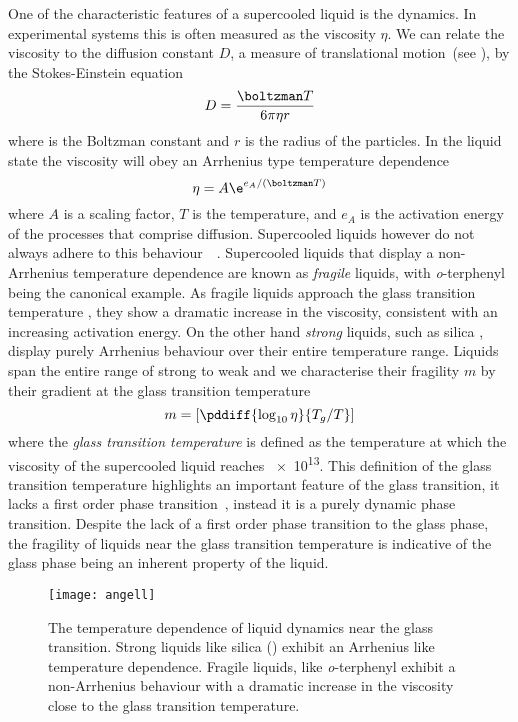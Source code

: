 One of the characteristic features of a supercooled liquid is the dynamics. In experimental systems this is often measured as the viscosity $\eta$. We can relate the viscosity to the diffusion constant $D$, a measure of translational motion~(see ), by the Stokes-Einstein equation~\cite{lubchenko:07}
\begin{equation}
    D = \frac{\boltzman T}{6\pi \eta r}
\end{equation}
where \boltzman{} is the Boltzman constant and $r$ is the radius of the particles. In the liquid state the viscosity will obey an Arrhenius type temperature dependence
\begin{equation}
    \eta = A \e^{e_A/(\boltzman T)}
\end{equation}
where $A$ is a scaling factor, $T$ is the temperature, and $e_A$ is the activation energy of the processes that comprise diffusion. Supercooled liquids however do not always adhere to this behaviour~~\cite{angell:91,angell:95,lubchenko:07}. Supercooled liquids that display a non-Arrhenius temperature dependence are known as \emph{fragile} liquids, with \emph{o}-terphenyl being the canonical example. As fragile liquids approach the glass transition temperature \si{\Tg}, they show a dramatic increase in the viscosity, consistent with an increasing activation energy. On the other hand \emph{strong} liquids, such as silica , display purely Arrhenius behaviour over their entire temperature range. Liquids span the entire range of strong to weak and we characterise their fragility $m$ by their gradient at the glass transition temperature
\begin{equation}
    m = \left [ \pddiff{\log_{10}\eta}{T_g/T} \right ]
\end{equation}
where the \emph{glass transition temperature} \si{\Tg} is defined as the temperature at which the viscosity of the supercooled liquid reaches \SI{e13}{\poise}. This definition of the glass transition temperature highlights an important feature of the glass transition, it lacks a first order phase transition~\cite{santen:00}, instead it is a purely dynamic phase transition. Despite the lack of a first order phase transition to the glass phase, the fragility of liquids near the glass transition temperature is indicative of the glass phase being an inherent property of the liquid.

\begin{figure}
    \centering
    \texttt{[image: angell]}
    \caption{The temperature dependence of liquid dynamics near the glass transition. Strong liquids like silica () exhibit an Arrhenius like temperature dependence. Fragile liquids, like {\em o}-terphenyl exhibit a non-Arrhenius behaviour with a dramatic increase in the viscosity close to the glass transition temperature.}
    \label{fig:angell}
\end{figure}

